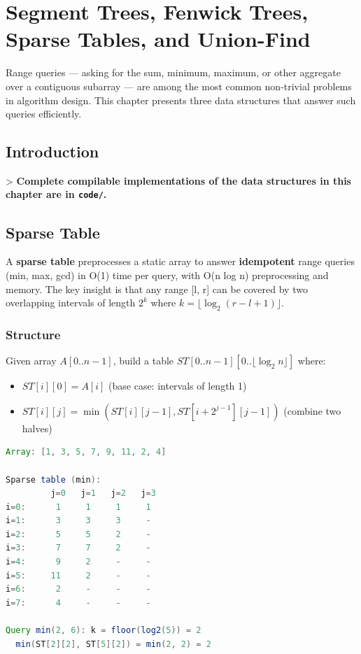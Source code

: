 \chapter{Segment Trees, Fenwick Trees, Sparse Tables, and Union-Find}\label{ch14:segment-trees-fenwick-trees-and-union-find}

Range queries — asking for the sum, minimum, maximum, or other aggregate over a contiguous subarray — are among the most common non-trivial problems in algorithm design. This chapter presents three data structures that answer such queries efficiently.

\section{Introduction}

> \textbf{Complete compilable implementations of the data structures in this chapter are in \texttt{code/}.}

\section{Sparse Table}

A \textbf{sparse table} preprocesses a static array to answer \textbf{idempotent} range queries (min, max, gcd) in O(1) time per query, with O(n log n) preprocessing and memory. The key insight is that any range [l, r] can be covered by two overlapping intervals of length $2^k$ where $k = \lfloor \log_2(r - l + 1) \rfloor$.

\subsection{Structure}

Given array $A[0..n-1]$, build a table $ST[0..n-1][0..\lfloor \log_2 n \rfloor]$ where:
\begin{itemize}
\item $ST[i][0] = A[i]$ (base case: intervals of length 1)
\item $ST[i][j] = \min(ST[i][j-1], ST[i + 2^{j-1}][j-1])$ (combine two halves)
\end{itemize}

\begin{lstlisting}[language=Java]
Array: [1, 3, 5, 7, 9, 11, 2, 4]

Sparse table (min):
         j=0   j=1   j=2   j=3
i=0:      1     1     1     1
i=1:      3     3     3     -
i=2:      5     5     2     -
i=3:      7     7     2     -
i=4:      9     2     -     -
i=5:     11     2     -     -
i=6:      2     -     -     -
i=7:      4     -     -     -

Query min(2, 6): k = floor(log2(5)) = 2
  min(ST[2][2], ST[5][2]) = min(2, 2) = 2
\end{lstlisting}

